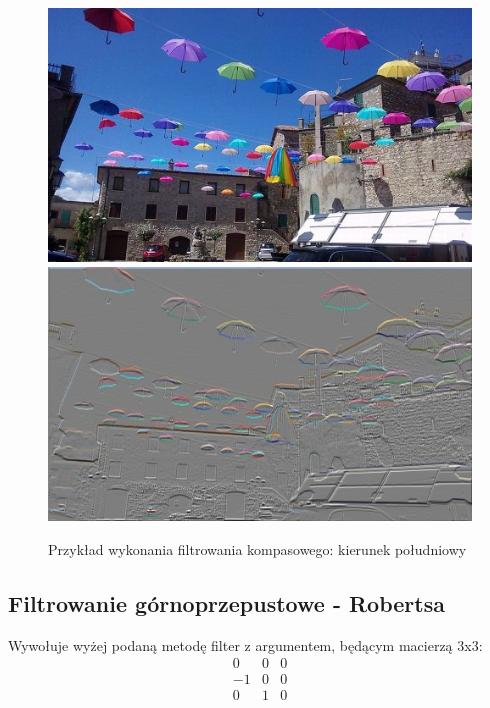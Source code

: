 \documentclass{article}
\begin{document}
	\begin{figure}[!ht]	
	\centering	
	\includegraphics[scale=1.2]{img/rgb-obraz1}
	\includegraphics[scale=1.2]{img/filtrowanie/rgb-gradientowekompasowe-poludnie}
	\caption{Przykład wykonania filtrowania kompasowego: kierunek południowy}
	\label{fig23}	
	\end{figure}	
	
	
	\subsection{Filtrowanie górnoprzepustowe - Robertsa}
	Wywołuje wyżej podaną metodę filter z argumentem, będącym macierzą 3x3:
	\begin{equation*}
	\begin{matrix}
	0 & 0 & 0 \\
	-1 & 0 & 0 \\
	0 & 1 & 0
	\end{matrix}
	\end{equation*}
		
\end{document}
